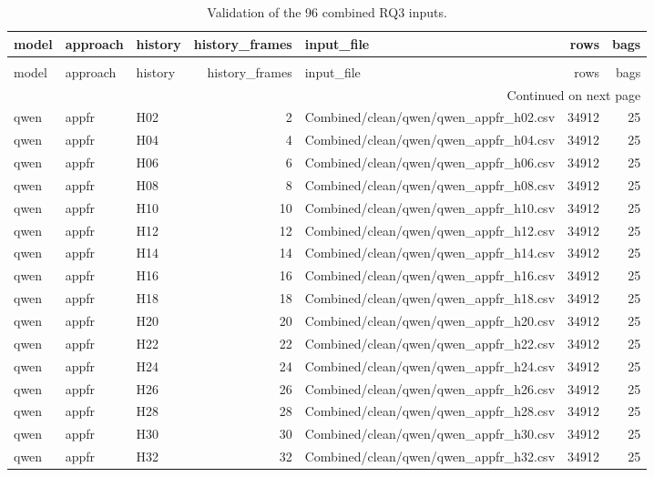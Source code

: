 \begin{longtable}{lllrlrr}
\caption{Validation of the 96 combined RQ3 inputs.} \label{tab:rq3-clean-validation} \\
\toprule
model & approach & history & history\_frames & input\_file & rows & bags \\
\midrule
\endfirsthead
\caption[]{Validation of the 96 combined RQ3 inputs.} \\
\toprule
model & approach & history & history\_frames & input\_file & rows & bags \\
\midrule
\endhead
\midrule
\multicolumn{7}{r}{Continued on next page} \\
\midrule
\endfoot
\bottomrule
\endlastfoot
qwen & appfr & H02 & 2 & Combined/clean/qwen/qwen\_appfr\_h02.csv & 34912 & 25 \\
qwen & appfr & H04 & 4 & Combined/clean/qwen/qwen\_appfr\_h04.csv & 34912 & 25 \\
qwen & appfr & H06 & 6 & Combined/clean/qwen/qwen\_appfr\_h06.csv & 34912 & 25 \\
qwen & appfr & H08 & 8 & Combined/clean/qwen/qwen\_appfr\_h08.csv & 34912 & 25 \\
qwen & appfr & H10 & 10 & Combined/clean/qwen/qwen\_appfr\_h10.csv & 34912 & 25 \\
qwen & appfr & H12 & 12 & Combined/clean/qwen/qwen\_appfr\_h12.csv & 34912 & 25 \\
qwen & appfr & H14 & 14 & Combined/clean/qwen/qwen\_appfr\_h14.csv & 34912 & 25 \\
qwen & appfr & H16 & 16 & Combined/clean/qwen/qwen\_appfr\_h16.csv & 34912 & 25 \\
qwen & appfr & H18 & 18 & Combined/clean/qwen/qwen\_appfr\_h18.csv & 34912 & 25 \\
qwen & appfr & H20 & 20 & Combined/clean/qwen/qwen\_appfr\_h20.csv & 34912 & 25 \\
qwen & appfr & H22 & 22 & Combined/clean/qwen/qwen\_appfr\_h22.csv & 34912 & 25 \\
qwen & appfr & H24 & 24 & Combined/clean/qwen/qwen\_appfr\_h24.csv & 34912 & 25 \\
qwen & appfr & H26 & 26 & Combined/clean/qwen/qwen\_appfr\_h26.csv & 34912 & 25 \\
qwen & appfr & H28 & 28 & Combined/clean/qwen/qwen\_appfr\_h28.csv & 34912 & 25 \\
qwen & appfr & H30 & 30 & Combined/clean/qwen/qwen\_appfr\_h30.csv & 34912 & 25 \\
qwen & appfr & H32 & 32 & Combined/clean/qwen/qwen\_appfr\_h32.csv & 34912 & 25 \\

\end{longtable}
